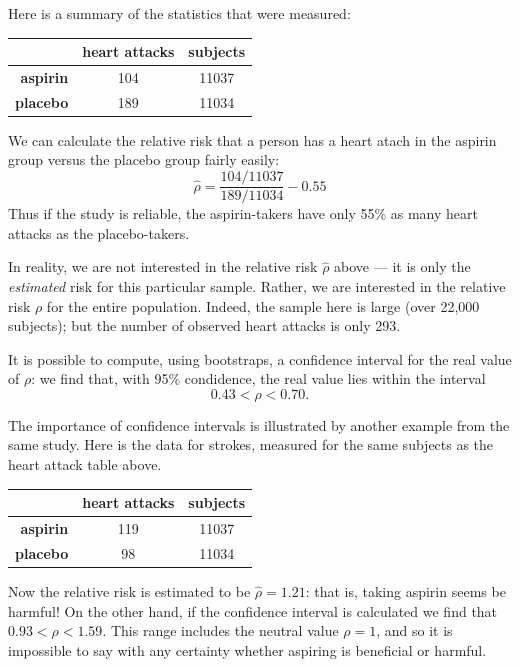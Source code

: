 \documentclass[a4paper,leqno]{article}
\numberwithin{equation}{section}
\theoremstyle{definition}
\theoremstyle{remark}
\begin{document}
Here is a summary of the statistics that were measured:
\begin{center}
  \begin{tabular}{r|cc}
    & \textbf{heart attacks} & \textbf{subjects}\\\hline
    \textbf{aspirin} & 104 & 11037\\
    \textbf{placebo} & 189 & 11034
  \end{tabular}
\end{center}

We can calculate the relative risk that a person has a heart atach in the aspirin
group versus the placebo group fairly easily:
\begin{displaymath}
  \hat\rho = \frac{104/11037}{189/11034} - 0.55
\end{displaymath}
Thus if the study is reliable, the aspirin-takers have only 55\% as many heart attacks
as the placebo-takers.

In reality, we are not interested in the relative risk $ \hat\rho $ above --- it is only
the \emph{estimated} risk for this particular sample. Rather, we are interested in the relative
risk $ \rho $ for the entire population. Indeed, the sample here is large (over 22,000 subjects);
but the number of observed heart attacks is only 293.

It is possible to compute, using bootstraps, a confidence interval for the real value of $ \rho $:
we find that, with 95\% condidence, the real value lies within the interval
\begin{displaymath}
  0.43 < \rho < 0.70.
\end{displaymath}

The importance of confidence intervals is illustrated by another example from the same study. Here
is the data for strokes, measured for the same subjects as the heart attack table above.
\begin{center}
  \begin{tabular}{r|cc}
    & \textbf{heart attacks} & \textbf{subjects}\\\hline
    \textbf{aspirin} & 119 & 11037\\
    \textbf{placebo} & 98 & 11034
  \end{tabular}
\end{center}
Now the relative risk is estimated to be $ \hat\rho = 1.21 $: that is, taking aspirin seems be harmful! On the other
hand, if the confidence interval is calculated we find that $ 0.93 < \rho < 1.59 $. This range includes the neutral
value $ \rho = 1 $, and so it is impossible to say with any certainty whether aspiring is beneficial or harmful.
\end{document}
